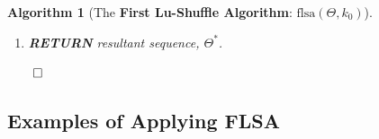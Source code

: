 \documentclass[a4paper, 18pt]{book} %
\newtheorem{alg}{Algorithm}
\begin{document}
\begin{alg}[The \textbf{First Lu-Shuffle Algorithm}: $\text{flsa}(\Theta, k_0)$]
\begin{enumerate}
{\begin{enumerate}
	\item{\textbf{IF} $k$ is \textbf{ODD}: $(k \mod 2) = 1$:
		\begin{enumerate}
			\item \textbf{UPDATE} \textbf{resultant sequence}, $\Theta^* = \Theta_{rest} \cdot \Theta_{swap}$
		\end{enumerate}
	}
	\item{\textbf{ELSE IF} $k$ is \textbf{EVEN}: $(k \mod 2) = 0$:
		\begin{enumerate}
		\item \textbf{UPDATE} \textbf{resultant sequence}, $\Theta^* = \Theta_{swap} \cdot \Theta_{rest}$
		\end{enumerate}
	}
	
	\item \textbf{INCREMENT} $k$: $k = k + 1$
\end{enumerate}
}
\item \textbf{RETURN} resultant sequence, $\Theta^*$.
\end{enumerate}
$\qed$
\end{alg}


\subsection{Examples of Applying FLSA}
\label{SECAPPLYFLSA}
\end{document}

